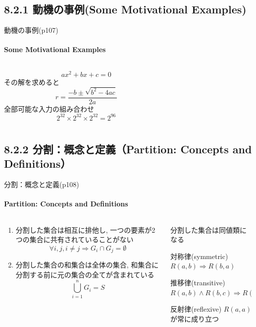 \subsection{8.2.1 動機の事例(Some Motivational Examples)}
\begin{frame}{動機の事例(p107)}
\framesubtitle{Some Motivational Examples}
\begin{columns}
\begin{column}{0.5\textwidth}
\[ ax^2+bx+c = 0 \]
\pause
その解を求めると
\[ r=\frac{-b \pm \sqrt{b^2-4ac}}{2a} \]
\pause
全部可能な入力の組み合わせ
\[ 2^{32} \times 2^{32} \times 2^{32} = 2^{96}\]
\end{column}
\begin{column}{0.5\textwidth}
\end{column}
\end{columns}
\end{frame}
\subsection{8.2.2 分割：概念と定義（Partition: Concepts and Definitions）}
\begin{frame}[shrink=10]{分割：概念と定義(p108)}
\framesubtitle{Partition: Concepts and Definitions}
\begin{columns}
\begin{column}{0.5\textwidth}
\begin{enumerate}
\item 分割した集合は相互に排他し, 一つの要素が2つの集合に共有されていることがない
    \[ \forall i,j,i\neq j \Rightarrow G_i \cap G_j = \emptyset \]
\pause
\item 分割した集合の和集合は全体の集合, 和集合に分割する前に元の集合の全てが含まれている
    \[ \bigcup_{i=1}^{n} G_i = S \]
\end{enumerate}

\end{column}
\pause
\begin{column}{0.5\textwidth}
分割した集合は同値類になる
\begin{block}{対称律(symmetric)} $R(a,b) \Rightarrow R(b,a) $ \end{block}
\begin{block}{推移律(transitive)} $R(a,b) \wedge R(b,c) \Rightarrow R(a,c)$ \end{block}
\begin{block}{反射律(reflexive)} $R(a,a)$ が常に成り立つ \end{block}
\end{column}
\end{columns}
\end{frame}
